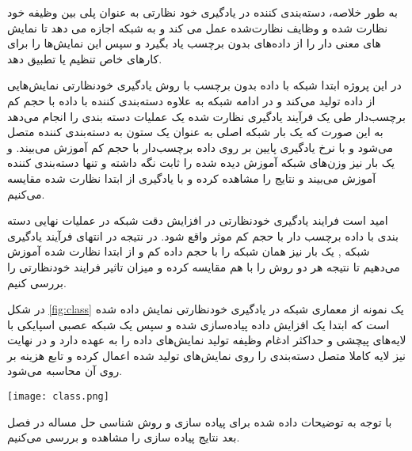 به طور خلاصه،  دسته‌بندی کننده در یادگیری خود نظارتی به عنوان پلی بین وظیفه خود نظارت شده و وظایف نظارت‌شده  عمل می کند و به شبکه اجازه می دهد تا نمایش های معنی دار را از داده‌های بدون برچسب یاد بگیرد و سپس این نمایش‌ها را برای کارهای خاص تنظیم یا تطبیق دهد.

در این پروژه ابتدا شبکه با داده بدون برچسب با روش یادگیری خودنظارتی نمایش‌هایی از داده تولید می‌کند و در ادامه شبکه به علاوه  دسته‌بندی کننده با داده با حجم کم برچسب‌دار طی یک فرآیند یادگیری نظارت شده یک عملیات دسته بندی را انجام می‌دهد به این صورت که یک بار شبکه اصلی به عنوان یک ستون  به  دسته‌بندی کننده متصل می‌شود و با نرخ یادگیری پایین بر روی داده برچسب‌دار با حجم کم آموزش ‌می‌بیند. و یک بار نیز وزن‌های شبکه آموزش دیده شده را ثابت نگه داشته و تنها  دسته‌بندی کننده آموزش می‌بیند و نتایج را مشاهده کرده و با یادگیری از ابتدا نظارت شده مقایسه می‌کنیم.

امید است فرایند یادگیری خودنظارتی در افزایش دقت شبکه در عملیات نهایی دسته بندی با داده برچسب دار با حجم کم موثر واقع شود. در نتیجه در انتهای فرآیند یادگیری شبکه , یک بار نیز همان شبکه را با حجم داده کم و از ابتدا نظارت شده آموزش می‌دهیم تا نتیجه هر دو روش را با هم مقایسه کرده و میزان تاثیر فرایند خودنظارتی را بررسی کنیم.

در شکل \ref{fig:class} یک نمونه از معماری شبکه در یادگیری خودنظارتی نمایش داده شده است که ابتدا یک افزایش داده پیاده‌سازی شده و سپس یک شبکه عصبی اسپایکی با لایه‌های پیچشی و حداکثر ادغام وظیفه تولید نمایش‌های داده را به عهده دارد و در نهایت نیز لایه کاملا متصل دسته‌بندی را روی نمایش‌های تولید شده اعمال کرده و تابع هزینه بر روی آن محاسبه می‌شود.




\begin{minipage}{\linewidth}
	\centering
	\texttt{[image: class.png]}
	\label{fig:class}
\end{minipage}

با توجه به توضیحات داده شده برای پیاده سازی و روش شناسی حل مساله در فصل بعد نتایج پیاده سازی را مشاهده و بررسی می‌کنیم.



